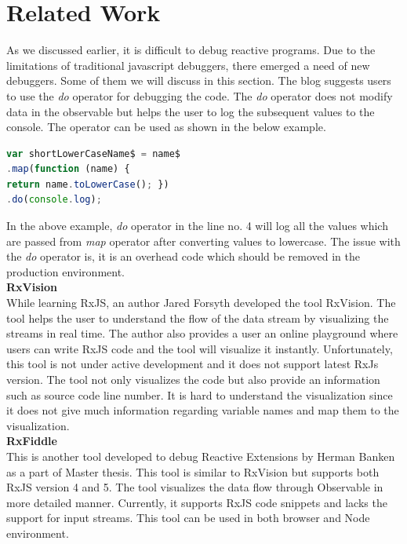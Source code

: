 \section{Related Work}
As we discussed earlier, it is difficult to debug reactive programs. Due to the limitations of traditional javascript debuggers, there emerged a need of new debuggers. Some of them we will discuss in this section. The blog\cite{debugrxjsblog} suggests users to use the \textit{do} operator for debugging the code. The \textit{do} operator does not modify data in the observable but helps the user to log the subsequent values to the console. The operator can be used as shown in the below example.
\begin{lstlisting}[language=JavaScript, caption=Do operator usage, label={lst:do-operator-example}]
var shortLowerCaseName$ = name$
.map(function (name) {
return name.toLowerCase(); })
.do(console.log);
\end{lstlisting}

In the above example, \textit{do} operator in the line no. 4 will log all the values which are passed from \textit{map} operator after converting values to lowercase. The issue with the \textit{do} operator is, it is an overhead code which should be removed in the production environment. 
\leavevmode
\\
\textbf{RxVision}
\\
While learning RxJS, an author Jared Forsyth developed the tool RxVision\cite{rxvision}. The tool helps the user to understand the flow of the data stream by visualizing the streams in real time. The author also provides a user an online playground where users can write RxJS code and the tool will visualize it instantly\cite{rxvisionplayground}. Unfortunately, this tool is not under active development and it does not support latest RxJs version. The tool not only visualizes the code but also provide an information such as source code line number. It is hard to understand the visualization since it does not give much information regarding variable names and map them to the visualization. 
\leavevmode
\\
\textbf{RxFiddle}
\\
This is another tool developed to debug Reactive Extensions by Herman Banken as a part of Master thesis\cite{rxfiddle}.  
This tool is similar to RxVision but supports both RxJS version 4 and 5. The tool visualizes the data flow through Observable in more detailed manner. 
Currently, it supports RxJS code snippets and lacks the support for input streams\cite{rxfiddle}. This tool can be used in both browser and Node environment.  

